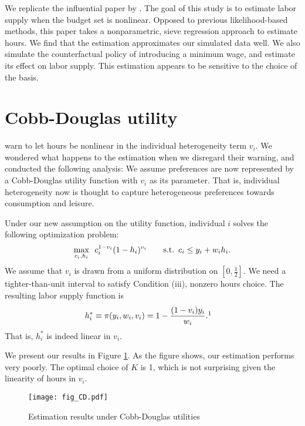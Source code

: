 \documentclass[11pt,letterpaper]{article}                  %
\begin{document}
We replicate the influential paper by \citet{Blomquist2002}.
The goal of this study is to estimate labor supply when the budget set is nonlinear.
Opposed to previous likelihood-based methods, this paper takes a nonparametric, sieve regression approach to estimate hours.
We find that the estimation approximates our simulated data well.
We also simulate the counterfactual policy of introducing a minimum wage, and estimate its effect on labor supply.
This estimation appears to be sensitive to the choice of the basis.





\newpage

\appendix

\section{Cobb-Douglas utility}
\label{app:CD}

\citet{Blomquist2002} warn to let hours be nonlinear in the individual heterogeneity term $v_i$.
We wondered what happens to the estimation when we disregard their warning, and conducted the following analysis:
We assume preferences are now represented by a Cobb-Douglas utility function with $v_i$ as its parameter.
That is, individual heterogeneity now is thought to capture heterogeneous preferences towards consumption and leisure.

Under our new assumption on the utility function, individual $i$ solves the following optimization problem:
\begin{align*}
	\max_{c_i, h_i} \enskip c_i^{1-v_i} (1-h_i)^{v_i} \qquad \text{s.t.} \enskip c_i \leq y_i + w_i h_i.
\end{align*}
We assume that $v_i$ is drawn from a uniform distribution on $[0, \tfrac{1}{2}]$.
We need a tighter-than-unit interval to satisfy Condition (iii), nonzero hours choice.
The resulting labor supply function is
\begin{align*}
	h^*_i &\equiv \pi (y_i, w_i, v_i) = 1 - \frac{(1-v_i) y_i}{w_i}.\footnotemark
\end{align*}
That is, $h^*_i$ is indeed linear in $v_i$.

We present our results in Figure \ref{fig:est2}.
As the figure shows, our estimation performs very poorly.
The optimal choice of $K$ is 1, which is not surprising given the linearity of hours in $v_i$.

\begin{figure}[H]
	\centering
	\caption{Estimation results under Cobb-Douglas utilities}
	\label{fig:est2}
	\texttt{[image: fig\_CD.pdf]}
\end{figure}
\end{document}
